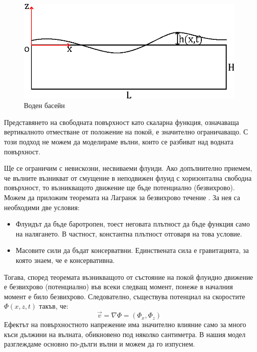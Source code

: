 \documentclass[12pt]{article}
\numberwithin{equation}{section}
\newcommand{\vel}{\vec{v}}
\begin{document}
\begin{figure}[h]
    \centering
    \includegraphics{figures/problem_description.eps}
    \caption{Воден басейн}
    \label{f:prob-description}
\end{figure}

Представянето на свободната повърхност като скаларна функция, означаваща вертикалното отместване от положение на покой, е значително ограничаващо. С този подход не можем да моделираме вълни, които се разбиват над водната повърхност.

Ще се ограничим с невискозни, несвиваеми флуиди. Ако допълнително приемем, че вълните възникват от смущение в неподвижен флуид с хоризонтална свободна повърхност, то възникващото движение ще бъде потенциално (безвихрово). Можем да приложим теоремата на Лагранж за безвихрово течение \cite{lagrange-theorem}. За нея са необходими две условия:
\begin{itemize}
    \item Флуидът да бъде баротропен, тоест неговата плътност да бъде функция само на налягането. В частност, константна плътност отговаря на това условие.
    \item Масовите сили да бъдат консерватвни. Единствената сила е гравитацията, за която знаем, че е консервативна.
\end{itemize}
Тогава, според теоремата възникващото от състояние на покой флуидно движение е безвихрово (потенциално) във всеки следващ момент, понеже в началния момент е било безвихрово. Следователно, съществува потенциал на скоростите $\Phi(x,z,t)$ такъв, че:
\begin{equation}
    \label{e:potential}
    \vel = \nabla\Phi = (\Phi_x,\Phi_z)
\end{equation}
Ефектът на повърхностното напрежение има значително влияние само за много къси дължини на вълната, обикновено под няколко сантиметра. В нашия модел разглеждаме основно по-дълги вълни и можем да го изпуснем.
\end{document}
